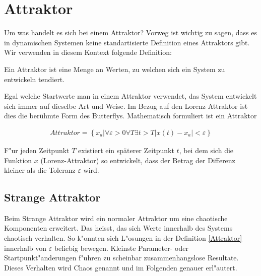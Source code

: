 \documentclass[attraktor.tex]{subfiles}
\begin{document}
	\section{Attraktor}
	Um was handelt es sich bei einem Attraktor?
	Vorweg ist wichtig zu sagen, dass es in dynamischen Systemen keine standartisierte Definition eines Attraktors gibt. Wir verwenden in diesem Kontext folgende Definition: 
	\begin{center}
		Ein Attraktor ist eine Menge an Werten, zu welchen sich ein System zu entwickeln tendiert.
	\end{center} Egal welche Startwerte man in einem Attraktor verwendet, das System entwickelt sich immer auf dieselbe Art und Weise. Im Bezug auf den Lorenz Attraktor ist dies die berühmte Form des Butterflys. Mathematisch formuliert ist ein Attraktor 
	\begin{centerFigure}
		\begin{align}
			\label{Attraktor}Attraktor = \left\{ x_a | \forall \varepsilon > 0
			\forall T \exists t > T
			|x(t) - x_a| < \varepsilon \right\} 
		\end{align}
	\end{centerFigure}
	
	F"ur jeden Zeitpunkt $T$ existiert ein späterer Zeitpunkt $t$, bei dem sich die Funktion $x$ (Lorenz-Attraktor) so entwickelt, dass der Betrag der Differenz kleiner als die Toleranz $\varepsilon$ wird.
	
	\subsection{Strange Attraktor}
	Beim Strange Attraktor wird ein normaler Attraktor um eine chaotische Komponenten erweitert. Das heisst, das sich Werte innerhalb des Systems chaotisch verhalten. So k"onnten sich L"osungen in der Definition \eqref{Attraktor} innerhalb von $\varepsilon$ beliebig bewegen. Kleinste Parameter- oder Startpunkt"anderungen f"uhren zu scheinbar zusammenhangslose Resultate. Dieses Verhalten wird Chaos genannt und im Folgenden genauer erl"autert.
	
\end{document}
